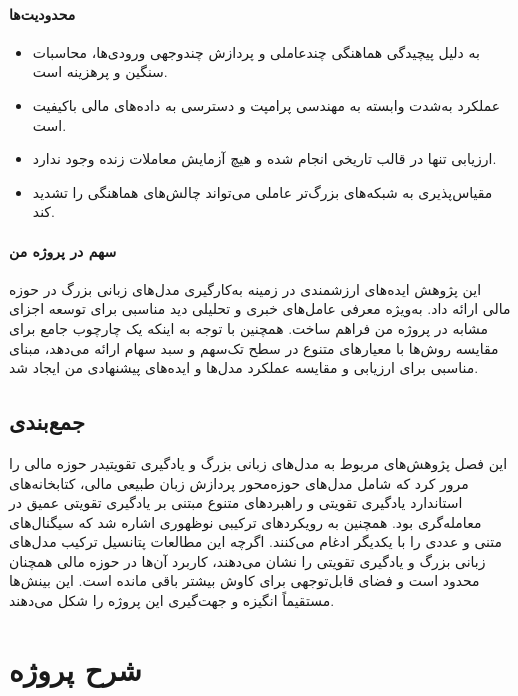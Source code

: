 \documentclass[12pt, a4paper]{report}
\begin{document}
\subsubsection{محدودیت‌ها}
\begin{itemize}
    \item به دلیل پیچیدگی هماهنگی چندعاملی و پردازش چندوجهی ورودی‌ها، محاسبات سنگین و پرهزینه است.  
    \item عملکرد به‌شدت وابسته به مهندسی پرامپت و دسترسی به داده‌های مالی باکیفیت است.  
    \item ارزیابی تنها در قالب  تاریخی انجام شده و هیچ آزمایش معاملات زنده وجود ندارد.  
    \item مقیاس‌پذیری به شبکه‌های بزرگ‌تر عاملی می‌تواند چالش‌های هماهنگی را تشدید کند.  
\end{itemize}

\subsubsection{سهم در پروژه من}
این پژوهش ایده‌های ارزشمندی در زمینه به‌کارگیری مدل‌های زبانی بزرگ در حوزه مالی ارائه داد. به‌ویژه معرفی عامل‌های خبری و تحلیلی دید مناسبی برای توسعه اجزای مشابه در پروژه من فراهم ساخت. همچنین با توجه به اینکه  یک چارچوب جامع برای مقایسه روش‌ها با معیارهای متنوع در سطح تک‌سهم و سبد سهام ارائه می‌دهد، مبنای مناسبی برای ارزیابی و مقایسه عملکرد مدل‌ها و ایده‌های پیشنهادی من ایجاد شد.

\section{جمع‌بندی}

این فصل پژوهش‌های مربوط به مدل‌های زبانی بزرگ و یادگیری تقویتیدر حوزه مالی را مرور کرد که شامل مدل‌های حوزه‌محور پردازش زبان طبیعی مالی، کتابخانه‌های استاندارد یادگیری تقویتی و راهبردهای متنوع مبتنی بر یادگیری تقویتی عمیق در معامله‌گری بود. همچنین به رویکردهای ترکیبی نوظهوری اشاره شد که سیگنال‌های متنی و عددی را با یکدیگر ادغام می‌کنند.  
اگرچه این مطالعات پتانسیل ترکیب مدل‌های زبانی بزرگ و یادگیری تقویتی را نشان می‌دهند، کاربرد آن‌ها در حوزه مالی همچنان محدود است و فضای قابل‌توجهی برای کاوش بیشتر باقی مانده است. این بینش‌ها مستقیماً انگیزه و جهت‌گیری این پروژه را شکل می‌دهند.



\chapter{شرح پروژه}
\end{document}
